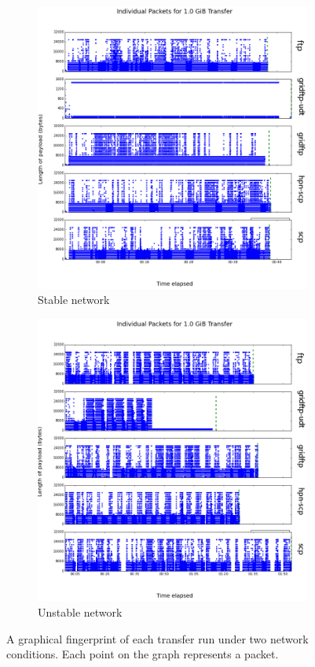 \documentclass{sig-alternate-05-2015}
\begin{document}
\begin{figure}
\centering
	\begin{subfigure}{.4\linewidth}
	\includegraphics[width=\linewidth]{img/packets/good.png}
	\caption{Stable network}
	\label{fig:good_transfer}
	\end{subfigure}
	\begin{subfigure}{.4\linewidth}
	\includegraphics[width=\linewidth]{img/packets/bad.png}
	\caption{Unstable network}
	\label{fig:bad_transfer}
	\end{subfigure}
\caption{A graphical fingerprint of each transfer run under two network conditions. Each point on the graph represents a packet.}
\label{fig:packets}
\end{figure}
\end{document}
